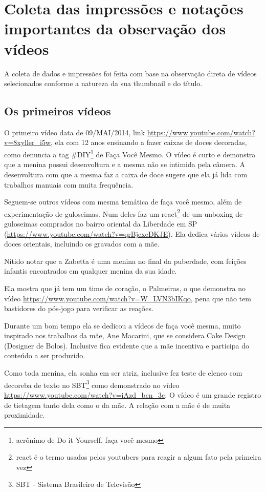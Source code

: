 \section{Coleta das impressões e notações importantes da observação dos vídeos}

A coleta de dados e impressões foi feita com base na observação direta de vídeos selecionados conforme a natureza da sua thumbnail e do título.

\subsection{Os primeiros vídeos}

O primeiro vídeo data de 09/MAI/2014, link \url{https://www.youtube.com/watch?v=8xyller_i5w}, ela com 12 anos ensinando a fazer caixas de doces decoradas, como denuncia a tag \#DIY\footnote{acrônimo de Do it Yourself, faça você mesmo} de Faça Você Mesmo. O vídeo é curto e demonstra que a menina possui desenvoltura e a mesma não se intimida pela câmera. A desenvoltura com que a mesma faz a caixa de doce sugere que ela já lida com trabalhos manuais com muita frequência.

Seguem-se outros vídeos com mesma temática de faça você mesmo, além de experimentação de guloseimas. Num deles faz um react\footnote{react é o termo usados pelos youtubers para reagir a algum fato pela primeira vez} de um unboxing de guloseimas comprados no bairro oriental da Liberdade em SP (\url{https://www.youtube.com/watch?v=qrBjcxeDKJE}). Ela dedica vários vídeos de doces orientais, incluindo os gravados com a mãe.

Nítido notar que a Zabetta é uma menina no final da puberdade, com feições infantis encontrados em qualquer menina da sua idade.

Ela mostra que já tem um time de coração, o Palmeiras, o que demonstra no vídeo \url{https://www.youtube.com/watch?v=W_LVN3bIKqo}, pena que não tem bastidores do pós-jogo para verificar as reações.

Durante um bom tempo ela se dedicou a vídeos de faça você mesma, muito inspirado nos trabalhos da mãe, Ane Macarini, que se considera Cake Design (Designer de Bolos). Inclusive fica evidente que a mãe incentiva e participa do conteúdo a ser produzido.

Como toda menina, ela sonha em ser atriz, inclusive fez teste de elenco com decoreba de texto no SBT\footnote{SBT - Sistema Brasileiro de Televisão} como demonstrado no vídeo \url{https://www.youtube.com/watch?v=iAzd_bcn_3c}. O vídeo é um grande registro de tietagem tanto dela como o da mãe. A relação com a mãe é de muita proximidade.

